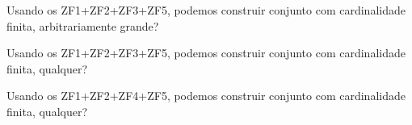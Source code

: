 \begin{exercise}
	Usando os ZF1+ZF2+ZF3+ZF5, podemos construir conjunto com cardinalidade finita, arbitrariamente grande?
\end{exercise}

\begin{exercise}
	Usando os ZF1+ZF2+ZF3+ZF5, podemos construir conjunto com cardinalidade finita, qualquer?
\end{exercise}

\begin{exercise}
	Usando os ZF1+ZF2+ZF4+ZF5, podemos construir conjunto com cardinalidade finita, qualquer?
\end{exercise}
